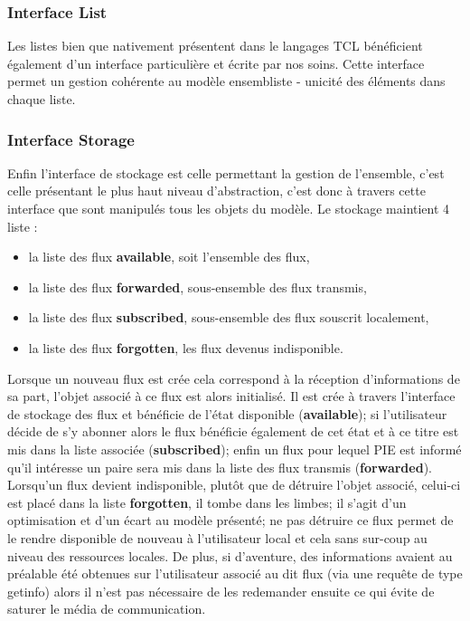 \subsubsection{Interface List}

Les listes bien que nativement présentent dans le langages TCL bénéficient également
d'un interface particulière et écrite par nos soins. Cette interface permet un gestion
cohérente au modèle ensembliste - unicité des éléments dans chaque liste.

\subsubsection{Interface Storage}

Enfin l'interface de stockage est celle permettant la gestion de l'ensemble, c'est 
celle présentant le plus haut niveau d'abstraction, c'est donc à travers cette interface
que sont manipulés tous les objets du modèle. Le stockage maintient 4 liste : \\

\begin{itemize}
	\item la liste des flux \textbf{available}, soit l'ensemble des flux,
	\item la liste des flux \textbf{forwarded}, sous-ensemble des flux transmis,
	\item la liste des flux \textbf{subscribed}, sous-ensemble des flux souscrit localement,
	\item la liste des flux \textbf{forgotten}, les flux devenus indisponible. \\
\end{itemize}

Lorsque un nouveau flux est crée cela correspond à la réception d'informations de sa part, l'objet
associé à ce flux est alors initialisé. Il est crée à travers l'interface de stockage des flux et
bénéficie de l'état disponible (\textbf{available}); si l'utilisateur décide de s'y abonner alors
le flux bénéficie également de cet état et à ce titre est mis dans la liste associée (\textbf{subscribed});
enfin un flux pour lequel PIE est informé qu'il intéresse un paire sera mis dans la liste des flux
transmis (\textbf{forwarded}). \\

Lorsqu'un flux devient indisponible, plutôt que de détruire l'objet associé, celui-ci est placé dans la
liste \textbf{forgotten}, il tombe dans les limbes; il s'agit d'un optimisation et d'un écart au modèle
présenté; ne pas détruire ce flux permet de le rendre disponible de nouveau à l'utilisateur local et
cela sans sur-coup au niveau des ressources locales. De plus, si d'aventure, des informations avaient
au préalable été obtenues sur l'utilisateur associé au dit flux (via une requête de type getinfo) alors
il n'est pas nécessaire de les redemander ensuite ce qui évite de saturer le média de communication. \\

